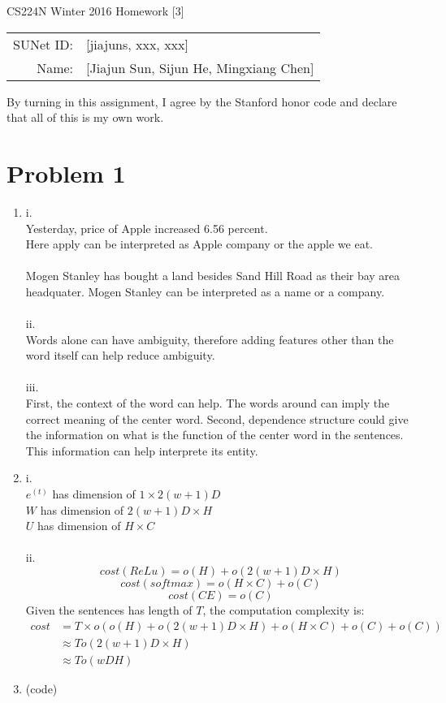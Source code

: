 \documentclass[10pt]{article}
\begin{document}
\begin{center}
{\Large CS224N Winter 2016 Homework [3]}

\begin{tabular}{rl}
SUNet ID: & [jiajuns, xxx, xxx] \\
Name: & [Jiajun Sun, Sijun He, Mingxiang Chen] \\
\end{tabular}
\end{center}

By turning in this assignment, I agree by the Stanford honor code and declare
that all of this is my own work.

\section*{Problem 1}
\begin{enumerate}[label=(\alph*)]
\item
i.\\
Yesterday, price of Apple increased 6.56 percent.\\
Here apply can be interpreted as Apple company or the apple we eat.\\
\\
Mogen Stanley has bought a land besides Sand Hill Road as their bay area headquater.
Mogen Stanley can be interpreted as a name or a company.\\
\\

ii.\\
Words alone can have ambiguity, therefore adding features other than the word itself can help reduce ambiguity.\\
\\

iii.\\
First, the context of the word can help. The words around can imply the correct meaning of the center word.
Second, dependence structure could give the information on what is the function of the center word in the sentences.
This information can help interprete its entity.

\item
i.\\
$e^{(t)}$ has dimension of $1 \times 2(w+1)D$\\
$W$ has dimension of $2(w+1)D \times H$\\
$U$ has dimension of $H \times C$\\
\\
ii.\\
$$cost(ReLu) = o(H) + o(2(w+1)D \times H)$$
$$cost(softmax) = o(H \times C) + o(C)$$
$$cost(CE) = o(C)$$
Given the sentences has length of $T$, the computation complexity is:
$$
\begin{aligned}
cost
& = T \times o(o(H) + o(2(w+1)D \times H) + o(H \times C) + o(C) + o(C))\\
& \approx T o(2(w+1)D \times H)\\
& \approx T o(wDH)
\end{aligned}
$$

\item
(code)

\end{enumerate}
\end{document}
